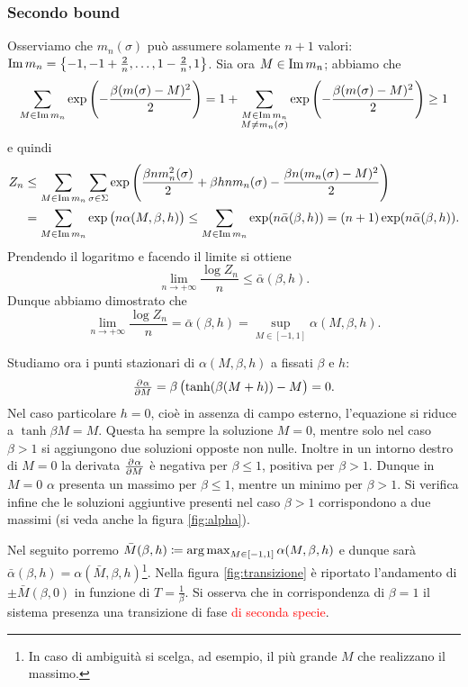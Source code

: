 \subsubsection{Secondo bound}
Osserviamo che $ m_n(\sigma) $ può assumere solamente $ n+1 $ valori: $ \operatorname{Im} m_n = \left\{ -1, -1 + \frac{2}{n}, \ldots, 1-\frac{2}{n}, 1 \right\} $. Sia ora $ M \in \operatorname{Im} m_n $; abbiamo che
\[ \sum_{M\in \operatorname{Im} m_n} \exp\left( -\frac{\beta(m(\sigma)-M)^2}{2} \right) = 1 + \sum_{\substack{M \in \operatorname{Im} m_n \\ M \neq m_n(\sigma)}} \exp\left( -\frac{\beta(m(\sigma)-M)^2}{2} \right) \geq 1 \]
e quindi
\begin{align*}
    Z_n & \leq \sum_{M\in \operatorname{Im} m_n} \sum_{\sigma \in \Sigma} \exp\left( \frac{\beta n m_n^2(\sigma)}{2} + \beta h n m_n(\sigma) - \frac{\beta n (m_n(\sigma)-M)^2}{2}\right)     \\
        & = \sum_{M\in \operatorname{Im} m_n} \exp\left( n \alpha(M, \beta, h) \right)
         \leq \sum_{M\in \operatorname{Im} m_n} \exp(n \bar{\alpha}(\beta, h)) = (n+1) \exp(n \bar{\alpha}(\beta, h)).
\end{align*}
Prendendo il logaritmo e facendo il limite si ottiene
\[  \lim_{n \to +\infty} \frac{\log Z_n}{n} \leq \bar{\alpha}(\beta,h). \]
Dunque abbiamo dimostrato che
\[ \lim_{n \to +\infty}\frac{\log Z_n}{n} = \bar{\alpha}(\beta,h) = \sup_{M\in[-1,1]} \alpha(M, \beta, h). \]

Studiamo ora i punti stazionari di $ \alpha(M, \beta, h) $ a fissati $ \beta $ e $ h $:
\begin{equation}\label{eq:mbar}
    \pd{\alpha}{M} = \beta \left( \tanh(\beta (M+h)) - M \right) = 0.
\end{equation}
Nel caso particolare $ h = 0 $, cioè in assenza di campo esterno, l'equazione si riduce a $ \tanh{\beta M} = M $. Questa ha sempre la soluzione $ M = 0 $, mentre solo nel caso $ \beta > 1 $ si aggiungono due soluzioni opposte non nulle. Inoltre in un intorno destro di $ M = 0 $ la derivata $ \pd{\alpha}{M} $ è negativa per $ \beta \leq 1 $, positiva per $ \beta > 1 $. Dunque in $ M = 0 $ $ \alpha $ presenta un massimo per $ \beta \leq 1 $, mentre un minimo per $ \beta > 1 $. Si verifica infine che le soluzioni aggiuntive presenti nel caso $ \beta > 1 $ corrispondono a due massimi (si veda anche la figura \ref{fig:alpha}).

Nel seguito porremo $ \bar{M}(\beta,h) \coloneqq \operatorname*{arg\, max}_{M\in[-1,1]} \alpha(M,\beta,h) $ e dunque sarà $ \bar{\alpha}(\beta, h) = \alpha(\bar{M}, \beta, h) $\footnote{In caso di ambiguità si scelga, ad esempio, il più grande $ M $ che realizzano il massimo.}. Nella figura \ref{fig:transizione} è riportato l'andamento di $ \pm \bar{M}(\beta, 0) $ in funzione di $ T=\frac{1}{\beta} $. Si osserva che in corrispondenza di $ \beta = 1 $ il sistema presenza una transizione di fase \textcolor{red}{di seconda specie}.

